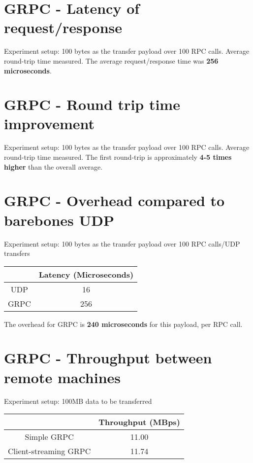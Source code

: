 \documentclass[a4paper]{article}
\begin{document}
\section{GRPC - Latency of request/response}
Experiment setup: 100 bytes as the transfer payload over 100 RPC calls. Average round-trip time measured.
The average request/response time was \textbf{256 microseconds}.

\section{GRPC - Round trip time improvement}
Experiment setup: 100 bytes as the transfer payload over 100 RPC calls. Average round-trip time measured.
The first round-trip is approximately \textbf{4-5 times higher} than the overall average.

\section{GRPC - Overhead compared to barebones UDP}
Experiment setup: 100 bytes as the transfer payload over 100 RPC calls/UDP transfers
\begin{center}
	\begin{tabular}{ |c|c| } 
		\hline
		& Latency (Microseconds) \\ 
		\hline
		\hline
		UDP & 16 \\ 
		\hline
		GRPC & 256 \\ 
		\hline
	\end{tabular}
\end{center}
The overhead for GRPC is \textbf{240 microseconds} for this payload, per RPC call.

\section{GRPC - Throughput between remote machines}
Experiment setup: 100MB data to be transferred
\begin{center}
	\begin{tabular}{ |c|c| } 
		\hline
		& Throughput (MBps) \\ 
		\hline
		\hline
		Simple GRPC & 11.00 \\ 
		\hline
		Client-streaming GRPC & 11.74 \\ 
		\hline
	\end{tabular}
\end{center}
\end{document}
